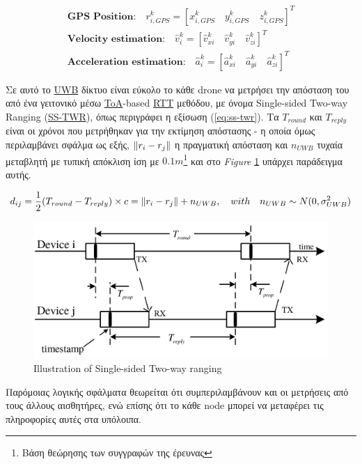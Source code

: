 \begin{gather*}
	\textbf{GPS Position:}\quad r^k_{i, GPS} = \left[x^k_{i, GPS} \quad y^k_{i, GPS} \quad z^k_{i, GPS}\right]^T \\
	\textbf{Velocity estimation:}\quad\hat{v}^k_i = \left[\hat{v}^k_{xi} \quad \hat{v}^k_{yi} \quad \hat{v}^k_{zi}\right]^T \\
	\textbf{Acceleration estimation:}\quad\hat{a}^k_i = \left[\hat{a}^k_{xi} \quad \hat{a}^k_{yi} \quad \hat{a}^k_{zi}\right]^T
\end{gather*}

Σε αυτό το \hyperref[abbr:UWB]{UWB} δίκτυο είναι εύκολο το κάθε drone να μετρήσει την απόσταση του από ένα γειτονικό
μέσω \hyperref[abbr:ToA]{ToA}-based \hyperref[abbr:RTT]{RTT} μεθόδου, με όνομα Single-sided Two-way Ranging (\hyperref[abbr:SS-TWR]{SS-TWR}),
όπως περιγράφει η εξίσωση (\ref{eq:ss-twr}). Τα $T_{round}$ και $T_{reply}$ είναι
οι χρόνοι που μετρήθηκαν για την εκτίμηση απόστασης - η οποία όμως περιλαμβάνει σφάλμα ως εξής, $\left\lVert r_i - r_j\right\rVert$ η πραγματική απόσταση και $n_{UWB}$ τυχαία μεταβλητή με τυπική απόκλιση ίση με 
$0.1m$\footnote{Βάση θεώρησης των συγγραφών της έρευνας} και στο \emph{Figure} \ref{fig:SS-TWR} υπάρχει παράδειγμα αυτής.

\begin{gather}
    d_{ij} = \frac{1}{2}(T_{round} - T_{reply}) \times c = \left\lVert r_i - r_j\right\rVert + n_{UWB}, \quad with \quad n_{UWB} \sim N(0, \sigma^2_{UWB}) \label{eq:ss-twr}
\end{gather}

\begin{figure} [H]
	\centering
	\includegraphics[width=0.69
	\linewidth]{Images/Related-Work/Single-Sided-Two-Way-Ranging-SS-TWR-5.png}
	\decoRule
	\caption[Illustration of Single-sided Two-way ranging]{Illustration of Single-sided Two-way ranging \cite{uwb-imu-gps1}}
	\label{fig:SS-TWR}
\end{figure}

Παρόμοιας λογικής σφάλματα θεωρείται ότι συμπεριλαμβάνουν και οι μετρήσεις από
τους άλλους αισθητήρες, ενώ επίσης ότι το κάθε node μπορεί να μεταφέρει τις πληροφορίες 
αυτές στα υπόλοιπα.

